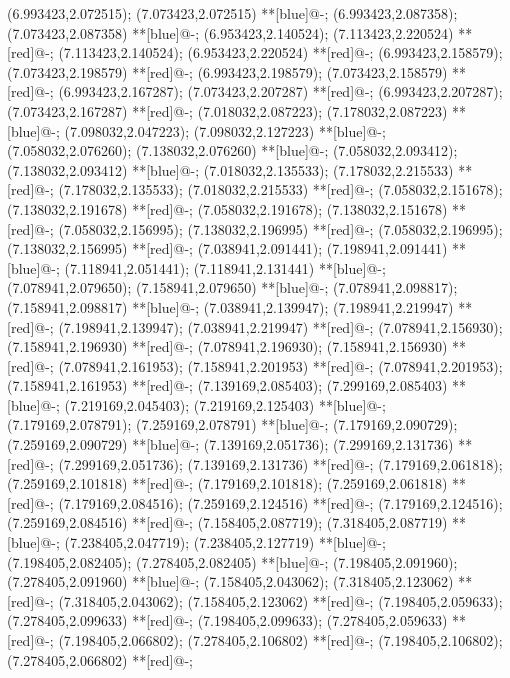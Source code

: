 (6.993423,2.072515); (7.073423,2.072515) **[blue]@{-};
(6.993423,2.087358); (7.073423,2.087358) **[blue]@{-};
(6.953423,2.140524); (7.113423,2.220524) **[red]@{-};
(7.113423,2.140524); (6.953423,2.220524) **[red]@{-};
(6.993423,2.158579); (7.073423,2.198579) **[red]@{-};
(6.993423,2.198579); (7.073423,2.158579) **[red]@{-};
(6.993423,2.167287); (7.073423,2.207287) **[red]@{-};
(6.993423,2.207287); (7.073423,2.167287) **[red]@{-};
(7.018032,2.087223); (7.178032,2.087223) **[blue]@{-};
(7.098032,2.047223); (7.098032,2.127223) **[blue]@{-};
(7.058032,2.076260); (7.138032,2.076260) **[blue]@{-};
(7.058032,2.093412); (7.138032,2.093412) **[blue]@{-};
(7.018032,2.135533); (7.178032,2.215533) **[red]@{-};
(7.178032,2.135533); (7.018032,2.215533) **[red]@{-};
(7.058032,2.151678); (7.138032,2.191678) **[red]@{-};
(7.058032,2.191678); (7.138032,2.151678) **[red]@{-};
(7.058032,2.156995); (7.138032,2.196995) **[red]@{-};
(7.058032,2.196995); (7.138032,2.156995) **[red]@{-};
(7.038941,2.091441); (7.198941,2.091441) **[blue]@{-};
(7.118941,2.051441); (7.118941,2.131441) **[blue]@{-};
(7.078941,2.079650); (7.158941,2.079650) **[blue]@{-};
(7.078941,2.098817); (7.158941,2.098817) **[blue]@{-};
(7.038941,2.139947); (7.198941,2.219947) **[red]@{-};
(7.198941,2.139947); (7.038941,2.219947) **[red]@{-};
(7.078941,2.156930); (7.158941,2.196930) **[red]@{-};
(7.078941,2.196930); (7.158941,2.156930) **[red]@{-};
(7.078941,2.161953); (7.158941,2.201953) **[red]@{-};
(7.078941,2.201953); (7.158941,2.161953) **[red]@{-};
(7.139169,2.085403); (7.299169,2.085403) **[blue]@{-};
(7.219169,2.045403); (7.219169,2.125403) **[blue]@{-};
(7.179169,2.078791); (7.259169,2.078791) **[blue]@{-};
(7.179169,2.090729); (7.259169,2.090729) **[blue]@{-};
(7.139169,2.051736); (7.299169,2.131736) **[red]@{-};
(7.299169,2.051736); (7.139169,2.131736) **[red]@{-};
(7.179169,2.061818); (7.259169,2.101818) **[red]@{-};
(7.179169,2.101818); (7.259169,2.061818) **[red]@{-};
(7.179169,2.084516); (7.259169,2.124516) **[red]@{-};
(7.179169,2.124516); (7.259169,2.084516) **[red]@{-};
(7.158405,2.087719); (7.318405,2.087719) **[blue]@{-};
(7.238405,2.047719); (7.238405,2.127719) **[blue]@{-};
(7.198405,2.082405); (7.278405,2.082405) **[blue]@{-};
(7.198405,2.091960); (7.278405,2.091960) **[blue]@{-};
(7.158405,2.043062); (7.318405,2.123062) **[red]@{-};
(7.318405,2.043062); (7.158405,2.123062) **[red]@{-};
(7.198405,2.059633); (7.278405,2.099633) **[red]@{-};
(7.198405,2.099633); (7.278405,2.059633) **[red]@{-};
(7.198405,2.066802); (7.278405,2.106802) **[red]@{-};
(7.198405,2.106802); (7.278405,2.066802) **[red]@{-};
